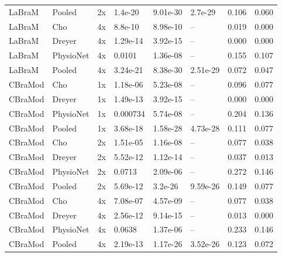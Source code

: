 \begin{longtable}{llllllll}
LaBraM & Pooled & 2x & 1.4e-20 & 9.01e-30 & 2.7e-29 & 0.106 & 0.060 \\
LaBraM & Cho & 4x & 8.8e-10 & 8.98e-10 & -- & 0.019 & 0.000 \\
LaBraM & Dreyer & 4x & 1.29e-14 & 3.92e-15 & -- & 0.000 & 0.000 \\
LaBraM & PhysioNet & 4x & 0.0101 & 1.36e-08 & -- & 0.155 & 0.107 \\
LaBraM & Pooled & 4x & 3.24e-21 & 8.38e-30 & 2.51e-29 & 0.072 & 0.047 \\
CBraMod & Cho & 1x & 1.18e-06 & 5.23e-08 & -- & 0.096 & 0.077 \\
CBraMod & Dreyer & 1x & 1.49e-13 & 3.92e-15 & -- & 0.000 & 0.000 \\
CBraMod & PhysioNet & 1x & 0.000734 & 5.74e-08 & -- & 0.204 & 0.136 \\
CBraMod & Pooled & 1x & 3.68e-18 & 1.58e-28 & 4.73e-28 & 0.111 & 0.077 \\
CBraMod & Cho & 2x & 1.51e-05 & 1.16e-08 & -- & 0.077 & 0.038 \\
CBraMod & Dreyer & 2x & 5.52e-12 & 1.12e-14 & -- & 0.037 & 0.013 \\
CBraMod & PhysioNet & 2x & 0.0713 & 2.09e-06 & -- & 0.272 & 0.146 \\
CBraMod & Pooled & 2x & 5.69e-12 & 3.2e-26 & 9.59e-26 & 0.149 & 0.077 \\
CBraMod & Cho & 4x & 7.08e-07 & 4.57e-09 & -- & 0.077 & 0.038 \\
CBraMod & Dreyer & 4x & 2.56e-12 & 9.14e-15 & -- & 0.013 & 0.000 \\
CBraMod & PhysioNet & 4x & 0.0638 & 1.37e-06 & -- & 0.233 & 0.146 \\
CBraMod & Pooled & 4x & 2.19e-13 & 1.17e-26 & 3.52e-26 & 0.123 & 0.072 \\
\bottomrule
\end{longtable}
